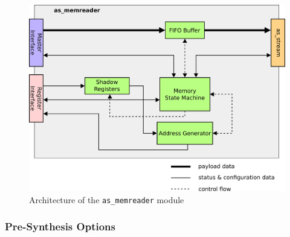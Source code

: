 \begin{figure}[ht]
    \centering
    \includegraphics[width=0.8\linewidth,clip]{figs/memreader.png}
    \caption{Architecture of the \texttt{as\_memreader} module}
    \label{fig:memreader}
\end{figure}

\subsubsection{Pre-Synthesis Options}



